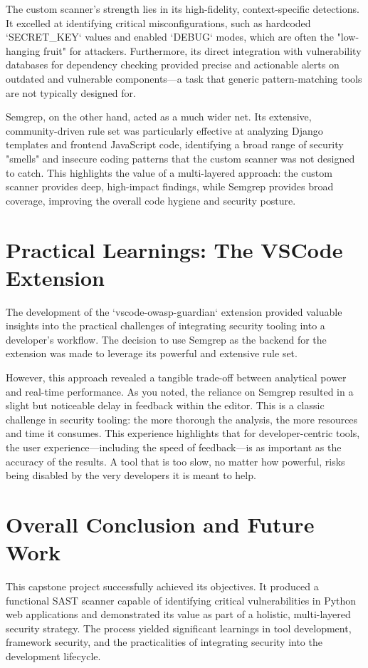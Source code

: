 The custom scanner's strength lies in its high-fidelity, context-specific detections. It excelled at identifying critical misconfigurations, such as hardcoded `SECRET_KEY` values and enabled `DEBUG` modes, which are often the "low-hanging fruit" for attackers. Furthermore, its direct integration with vulnerability databases for dependency checking provided precise and actionable alerts on outdated and vulnerable components—a task that generic pattern-matching tools are not typically designed for.

Semgrep, on the other hand, acted as a much wider net. Its extensive, community-driven rule set was particularly effective at analyzing Django templates and frontend JavaScript code, identifying a broad range of security "smells" and insecure coding patterns that the custom scanner was not designed to catch. This highlights the value of a multi-layered approach: the custom scanner provides deep, high-impact findings, while Semgrep provides broad coverage, improving the overall code hygiene and security posture.

\section{Practical Learnings: The VSCode Extension}

The development of the `vscode-owasp-guardian` extension provided valuable insights into the practical challenges of integrating security tooling into a developer's workflow. The decision to use Semgrep as the backend for the extension was made to leverage its powerful and extensive rule set.

However, this approach revealed a tangible trade-off between analytical power and real-time performance. As you noted, the reliance on Semgrep resulted in a slight but noticeable delay in feedback within the editor. This is a classic challenge in security tooling: the more thorough the analysis, the more resources and time it consumes. This experience highlights that for developer-centric tools, the user experience—including the speed of feedback—is as important as the accuracy of the results. A tool that is too slow, no matter how powerful, risks being disabled by the very developers it is meant to help.

\section{Overall Conclusion and Future Work}

This capstone project successfully achieved its objectives. It produced a functional SAST scanner capable of identifying critical vulnerabilities in Python web applications and demonstrated its value as part of a holistic, multi-layered security strategy. The process yielded significant learnings in tool development, framework security, and the practicalities of integrating security into the development lifecycle.

